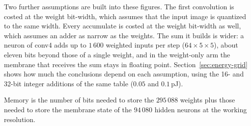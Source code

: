 Two further assumptions are built into these figures. The first convolution is
costed at the weight bit-width, which assumes that the input image is quantized
to the same width. Every accumulate is costed at the weight bit-width as well,
which assumes an adder as narrow as the weights. The sum it builds is wider: a
neuron of conv4 adds up to $1\,600$ weighted inputs per step ($64 \times 5
\times 5$), about eleven bits beyond those of a single weight, and in the
weight-only arm the membrane that receives the sum stays in floating point.
Section~\ref{sec:energy-grid} shows how much the conclusions depend on each
assumption, using the 16- and 32-bit integer additions of the same table
($0.05$ and $0.1$\,pJ).

Memory is the number of bits needed to store the $295\,088$ weights plus those
needed to store the membrane state of the $94\,080$ hidden neurons at the
working resolution.